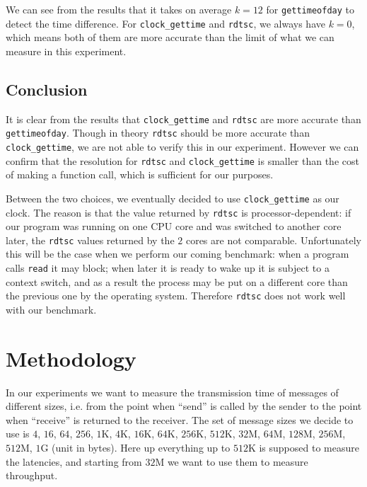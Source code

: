 \documentclass[11pt,conference]{IEEEtran}
\begin{document}
We can see from the results that it takes on average $k=12$ for \texttt{gettimeofday} to detect the time difference.
For \texttt{clock\_gettime} and \texttt{rdtsc}, we always have $k=0$, which means both of them are more accurate than the limit of what we can measure in this experiment.

\subsection{Conclusion}
It is clear from the results that \texttt{clock\_gettime} and \texttt{rdtsc} are more accurate than \texttt{gettimeofday}.
Though in theory \texttt{rdtsc} should be more accurate than \texttt{clock\_gettime}, we are not able to verify this in our experiment.
However we can confirm that the resolution for \texttt{rdtsc} and \texttt{clock\_gettime} is smaller than the cost of making a function call, which is sufficient for our purposes.

Between the two choices, we eventually decided to use \texttt{clock\_gettime} as our clock.
The reason is that the value returned by \texttt{rdtsc} is processor-dependent: if our program was running on one CPU core and was switched to another core later, the \texttt{rdtsc} values returned by the $2$ cores are not comparable.
Unfortunately this will be the case when we perform our coming benchmark: when a program calls \texttt{read} it may block; when later it is ready to wake up it is subject to a context switch, and as a result the process may be put on a different core than the previous one by the operating system.
Therefore \texttt{rdtsc} does not work well with our benchmark.

\section{Methodology}
\label{sec:method}
In our experiments we want to measure the transmission time of messages of different sizes, i.e. from the point when ``send'' is called by the sender to the point when ``receive'' is returned to the receiver.
The set of message sizes we decide to use is $4$, $16$, $64$, $256$, $1$K, $4$K, $16$K, $64$K, $256$K, $512$K, $32$M, $64$M, $128$M, $256$M, $512$M, $1$G (unit in bytes).
Here up everything up to $512$K is supposed to measure the latencies, and starting from $32$M we want to use them to measure throughput.
\end{document}
